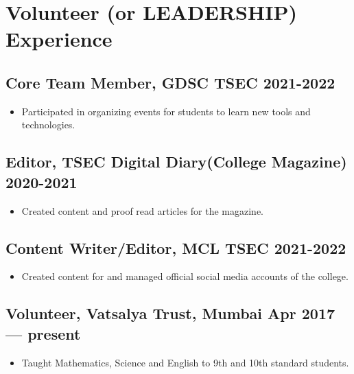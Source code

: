 \documentclass[10pt]{article}
\newenvironment{zitemize}{
\begin{itemize}\itemsep2pt \parskip0pt \parsep1pt}
{\end{itemize}\vspace{-0.5cm}}
\begin{document}
\section{Volunteer (or LEADERSHIP) Experience}

\subsection*{Core Team Member, GDSC TSEC \hfill 2021-2022} 
    \begin{zitemize}
            \item Participated in organizing events for students to learn new tools and technologies.
    \end{zitemize}
\subsection*{Editor, TSEC Digital Diary(College Magazine) \hfill 2020-2021} 
    \begin{zitemize}
            \item Created content and proof read articles for the magazine.
    \end{zitemize}
\subsection*{Content Writer/Editor, MCL TSEC \hfill 2021-2022} 
    \begin{zitemize}
            \item Created content for and managed official social media accounts of the college.
    \end{zitemize}
\subsection*{Volunteer, Vatsalya Trust, Mumbai \hfill Apr 2017 --- present} 
    \begin{zitemize}
            \item  Taught Mathematics, Science and English to 9th and 10th standard students.
    \end{zitemize}


\end{document}
